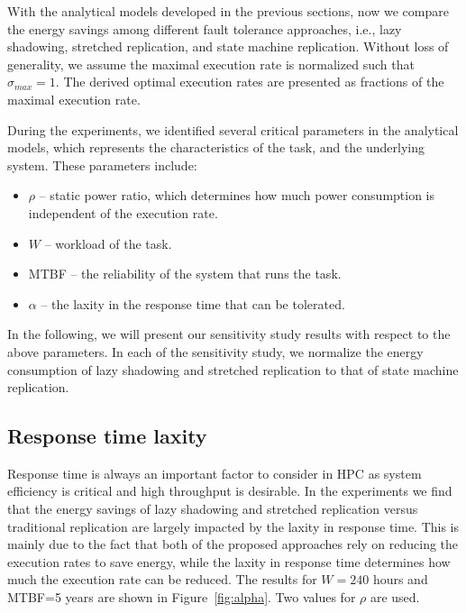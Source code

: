 With the analytical models developed in the previous sections, now we compare the energy savings among different fault tolerance approaches, i.e., lazy shadowing, stretched replication, and state machine replication. Without loss of generality, we assume the maximal execution rate is normalized such that $\sigma_{max}=1$. The derived optimal execution rates are presented as fractions of the maximal execution rate. 

During the experiments, we identified several critical parameters in the analytical models, which represents the characteristics of the task, and the underlying system. These parameters include:
\begin{itemize}
	\item $\rho$ -- static power ratio, which determines how much power consumption is independent of the execution rate.
	\item $W$ -- workload of the task.
	\item MTBF -- the reliability of the system that runs the task.
	\item $\alpha$ -- the laxity in the response time that can be tolerated.
\end{itemize}
In the following, we will present our sensitivity study results with respect to the above parameters. In each of the sensitivity study, we normalize the energy consumption of lazy shadowing and stretched replication to that of state machine replication. 

\subsection{Response time laxity}
Response time is always an important factor to consider in HPC as system efficiency is critical and high throughput is desirable. In the experiments we find that the energy savings of lazy shadowing and stretched replication versus traditional replication are largely impacted by the laxity in response time. This is mainly due to the fact that both of the proposed approaches rely on reducing the execution rates to save energy, while the laxity in response time determines how much the execution rate can be reduced. The results for $W=240$ hours and MTBF=5 years are shown in Figure~\ref{fig:alpha}. Two values for $\rho$ are used.

